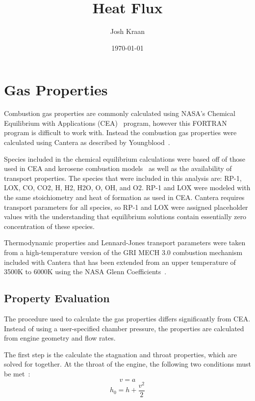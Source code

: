 \documentclass[11pt]{article}
\title{Heat Flux}
\author{Josh Kraan}
\date{\today}
\begin{document}
\maketitle

\section{Gas Properties}

Combustion gas properties are commonly calculated using NASA's Chemical Equilibrium with Applications (CEA)~\cite{gorden_computer_1996} program, however this FORTRAN program is difficult to work with. Instead the combustion gas properties were calculated using Cantera as described by Youngblood~\cite{youngblood_design_2015}.

Species included in the chemical equilibrium calculations were based off of those used in CEA and kerosene combustion models~\cite{wang_thermophysics_2001} as well as the availability of transport properties. The species that were included in this analysis are: RP-1, LOX, CO, CO2, H, H2, H2O, O, OH, and O2. RP-1 and LOX were modeled with the same stoichiometry and heat of formation as used in CEA. Cantera requires transport parameters for all species, so RP-1 and LOX were assigned placeholder values with the understanding that equilibrium solutions contain essentially zero concentration of these species.

Thermodynamic properties and Lennard-Jones transport parameters were taken from a high-temperature version of the GRI MECH 3.0 combustion mechanism~\cite{smith_gri-mech_????} included with Cantera that has been extended from an upper temperature of 3500K to 6000K using the NASA Glenn Coefficients~\cite{mcbride_nasa_2002}.

\subsection{Property Evaluation}

The procedure used to calculate the gas properties differs significantly from CEA. Instead of using a user-specified chamber pressure, the properties are calculated from engine geometry and flow rates.

The first step is the calculate the stagnation and throat properties, which are solved for together. At the throat of the engine, the following two conditions must be met~\cite{martinez-sanchez_reacting_????}:
\begin{equation}\label{cond:mach}
  v = a
\end{equation}%
\begin{equation}\label{cond:enthalpy}
  h_0 = h + \frac{v^2}{2}
\end{equation}
\end{document}

